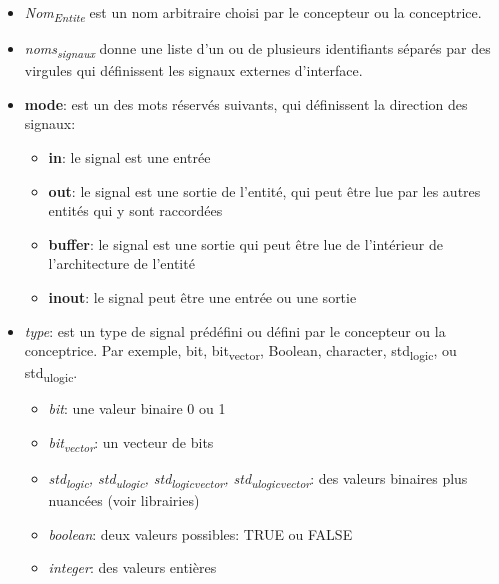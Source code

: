\documentclass[11pt]{article}
\begin{document}
\begin{itemize}
\item \emph{Nom\textsubscript{Entite}} est un nom arbitraire choisi par le concepteur ou la
conceptrice.

\item \emph{noms\textsubscript{signaux}} donne une liste d'un ou de plusieurs identifiants
séparés par des virgules qui définissent les signaux externes
d'interface.

\item \textbf{mode}: est un des mots réservés suivants, qui définissent la
direction des signaux:

\begin{itemize}
\item \textbf{in}: le signal est une entrée

\item \textbf{out}: le signal est une sortie de l'entité, qui peut être lue
par les autres entités qui y sont raccordées

\item \textbf{buffer}: le signal est une sortie qui peut être lue de
l'intérieur de l'architecture de l'entité

\item \textbf{inout}: le signal peut être une entrée ou une sortie
\end{itemize}

\item \emph{type}: est un type de signal prédéfini ou défini par le concepteur
ou la conceptrice. Par exemple, bit, bit\textsubscript{vector}, Boolean,
character, std\textsubscript{logic}, ou std\textsubscript{ulogic}.

\begin{itemize}
\item \emph{bit}: une valeur binaire  0 ou 1

\item \emph{bit\textsubscript{vector}}: un vecteur de bits

\item \emph{std\textsubscript{logic}, std\textsubscript{ulogic}, std\textsubscript{logic}\textsubscript{vector}, std\textsubscript{ulogic}\textsubscript{vector}}: des
valeurs binaires plus nuancées (voir librairies)

\item \emph{boolean}: deux valeurs possibles: TRUE ou FALSE

\item \emph{integer}: des valeurs entières


\end{itemize}
\end{itemize}
\end{document}
